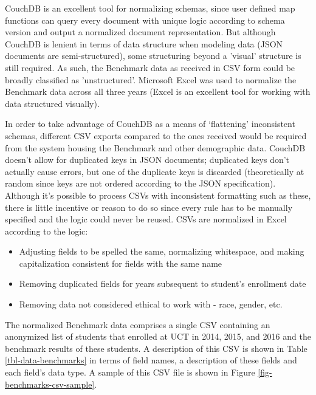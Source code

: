 CouchDB is an excellent tool for normalizing schemas, since user defined map functions can query every document with unique logic according to schema version and output a normalized document representation. But although CouchDB is lenient in terms of data structure when modeling data (JSON documents are semi-structured), some structuring beyond a 'visual' structure is still required. As such, the Benchmark data as received in CSV form could be broadly classified as 'unstructured'. Microsoft Excel was used to normalize the Benchmark data across all three years (Excel is an excellent tool for working with data structured visually).

In order to take advantage of CouchDB as a means of `flattening' inconsistent schemas, different CSV exports compared to the ones received would be required from the system housing the Benchmark and other demographic data. CouchDB doesn't allow for duplicated keys in JSON documents; duplicated keys don't actually cause errors, but one of the duplicate keys is discarded (theoretically at random since keys are not ordered according to the JSON specification). Although it's possible to process CSVs with inconsistent formatting such as these, there is little incentive or reason to do so since every rule has to be manually specified and the logic could never be reused. CSVs are normalized in Excel according to the logic:

\begin{itemize}
    \item Adjusting fields to be spelled the same, normalizing whitespace, and making capitalization consistent for fields with the same name
    \item Removing duplicated fields for years subsequent to student's enrollment date
    \item Removing data not considered ethical to work with - race, gender, etc.
\end{itemize}

The normalized Benchmark data comprises a single CSV containing an anonymized list of students that enrolled at UCT in 2014, 2015, and 2016 and the benchmark results of these students. A description of this CSV is shown in Table \ref{tbl-data-benchmarks} in terms of field names, a description of these fields and each field's data type. A sample of this CSV file is shown in Figure \ref{fig-benchmarks-csv-sample}.




